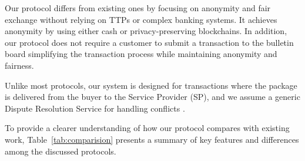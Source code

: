 \documentclass[pdftex,twocolumn,epjc3]{svjour3}
\begin{document}
Our protocol differs from existing ones by focusing on anonymity and fair exchange without relying on TTPs or complex banking systems. It achieves anonymity by using either cash or privacy-preserving blockchains. In addition, our protocol does not require a customer to submit a transaction to the bulletin board simplifying the transaction process while maintaining anonymity and fairness.

Unlike most protocols, our system is designed for transactions where the package is delivered from the buyer to the Service Provider (SP), and we assume a generic Dispute Resolution Service for handling conflicts .

To provide a clearer understanding of how our protocol compares with existing work, Table~\ref{tab:comparision} presents a summary of key features and differences among the discussed protocols.
\end{document}
